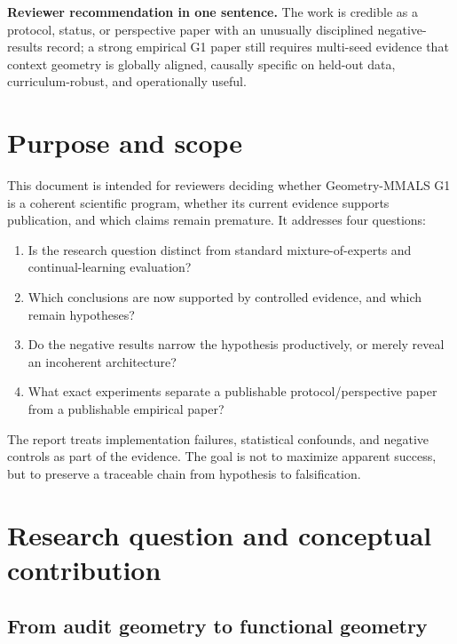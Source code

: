 \documentclass[11pt,a4paper]{article}
\begin{document}
\begin{summarybox}
\textbf{Reviewer recommendation in one sentence.} The work is credible as a protocol, status, or perspective paper with an unusually disciplined negative-results record; a strong empirical G1 paper still requires multi-seed evidence that context geometry is globally aligned, causally specific on held-out data, curriculum-robust, and operationally useful.
\end{summarybox}

\tableofcontents
\newpage

\section{Purpose and scope}

This document is intended for reviewers deciding whether Geometry-MMALS G1 is a coherent scientific program, whether its current evidence supports publication, and which claims remain premature. It addresses four questions:

\begin{enumerate}
\item Is the research question distinct from standard mixture-of-experts and continual-learning evaluation?
\item Which conclusions are now supported by controlled evidence, and which remain hypotheses?
\item Do the negative results narrow the hypothesis productively, or merely reveal an incoherent architecture?
\item What exact experiments separate a publishable protocol/perspective paper from a publishable empirical paper?
\end{enumerate}

The report treats implementation failures, statistical confounds, and negative controls as part of the evidence. The goal is not to maximize apparent success, but to preserve a traceable chain from hypothesis to falsification.

\section{Research question and conceptual contribution}

\subsection{From audit geometry to functional geometry}
\end{document}

